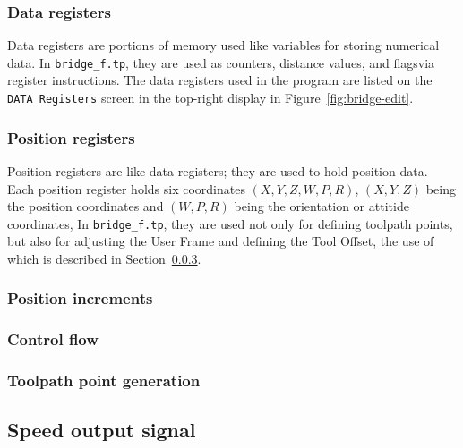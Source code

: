 \subsubsection{Data registers}
Data registers are portions of memory used like variables for storing numerical data\cite[sec~7.3]{lr-handling-tool}. In \verb|bridge_f.tp|, they are used as counters, distance values, and flagsvia register instructions\cite[sec~4.5.1]{lr-handling-tool}. The data registers used in the program are listed on the \verb|DATA Registers| screen in the top-right display in Figure~\ref{fig:bridge-edit}. 

\subsubsection{Position registers}
Position registers are like data registers; they are used to hold position data\cite[sec~7.4]{lr-handling-tool}. Each position register holds six coordinates \((X,Y,Z,W,P,R)\), \((X,Y,Z)\) being the position coordinates and \((W,P,R)\) being the orientation or attitide coordinates,  In \verb|bridge_f.tp|, they are used not only for defining toolpath points, but also for adjusting the User Frame and defining the Tool Offset, the use of which is described in Section~\ref{sec:pos-incr}. 

\subsubsection{Position increments}
\label{sec:pos-incr}
\subsubsection{Control flow}
\subsubsection{Toolpath point generation}
\label{sec:point-gen}

\subsection{Speed output signal}

